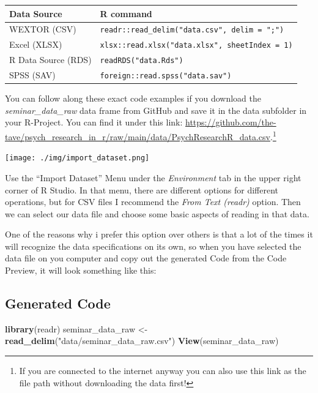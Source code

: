 \documentclass[
]{book}
\newenvironment{Shaded}{\begin{snugshade}}{\end{snugshade}}
\newcommand{\FunctionTok}[1]{\textcolor[rgb]{0.13,0.29,0.53}{\textbf{#1}}}
\newcommand{\NormalTok}[1]{#1}
\newcommand{\OtherTok}[1]{\textcolor[rgb]{0.56,0.35,0.01}{#1}}
\newcommand{\StringTok}[1]{\textcolor[rgb]{0.31,0.60,0.02}{#1}}
\begin{document}
\begin{longtable}[]{@{}ll@{}}
\toprule\noalign{}
Data Source & R command \\
\midrule\noalign{}
\endhead
\bottomrule\noalign{}
\endlastfoot
WEXTOR (CSV) & \texttt{readr::read\_delim("data.csv",\ delim\ =\ ";")} \\
Excel (XLSX) & \texttt{xlsx::read.xlsx("data.xlsx",\ sheetIndex\ =\ 1)} \\
R Data Source (RDS) & \texttt{readRDS("data.Rds")} \\
SPSS (SAV) & \texttt{foreign::read.spss("data.sav")} \\
\end{longtable}

You can follow along these exact code examples if you download the \emph{seminar\_data\_raw} data frame from GitHub and save it in the data subfolder in your R-Project.
You can find it under this link: \url{https://github.com/the-tave/psych_research_in_r/raw/main/data/PsychResearchR_data.csv}.\footnote{If you are connected to the internet anyway you can also use this link as the file path without downloading the data first!}

\texttt{[image: ./img/import\_dataset.png]}

Use the ``Import Dataset'' Menu under the \emph{Environment} tab in the upper right corner of R Studio.
In that menu, there are different options for different operations, but for CSV files I recommend the \emph{From Text (readr)} option.
Then we can select our data file and choose some basic aspects of reading in that data.

One of the reasons why i prefer this option over others is that a lot of the times it will recognize the data specifications on its own, so when you have selected the data file on you computer and copy out the generated Code from the Code Preview, it will look something like this:

\subsection*{Generated Code}\label{generated-code}

\begin{Shaded}
\begin{Highlighting}[]
\FunctionTok{library}\NormalTok{(readr)}
\NormalTok{seminar\_data\_raw }\OtherTok{\textless{}{-}} \FunctionTok{read\_delim}\NormalTok{(}\StringTok{"data/seminar\_data\_raw.csv"}\NormalTok{)}
\FunctionTok{View}\NormalTok{(seminar\_data\_raw)}
\end{Highlighting}
\end{Shaded}
\end{document}

